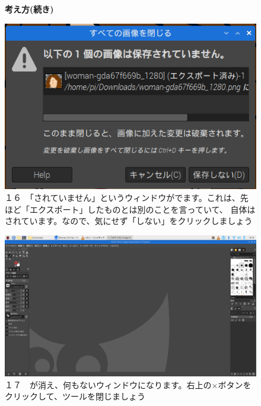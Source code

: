 \documentclass[a4paper,12pt]{jarticle}
\begin{document}
\begin{figure}
  \textbf{考え方(続き)}

  \begin{minipage}{\textwidth}
    \begin{minipage}{0.45\linewidth}
      \includegraphics[width=\linewidth]{textbook-img1031.png}\\
      １６　「されていません」というウィンドウがでます。これは、先ほど「エクスポート」したものとは別のことを言っていて、
      自体はされています。なので、気にせず「しない」をクリックしましょう
    \end{minipage}
    \hfill
    \begin{minipage}{0.45\linewidth}
      \includegraphics[width=\linewidth]{textbook-img1032.png}\\
      １７　が消え、何もないウィンドウになります。右上の×ボタンをクリックして、ツールを閉じましょう
    \end{minipage}
  \end{minipage}


\end{figure}
\end{document}
